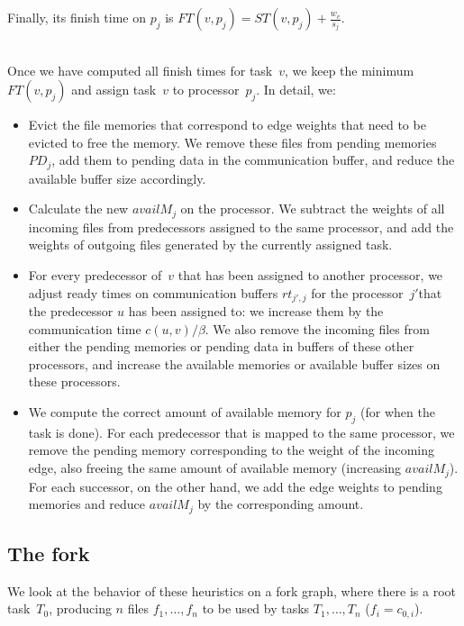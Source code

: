 \documentclass[conference]{IEEEtran}
\begin{document}
  \noindent  Finally, its finish time on $p_j$ is 
    $FT(v,p_j) = ST(v, p_j) + \frac{w_v}{s_j}$.



    \medskip
    \\
    Once we have computed all finish times for task~$v$,
    we keep the minimum $FT(v,p_j)$ and assign task~$v$
    to processor~$p_j$.
    In detail, we:
    \begin{itemize}
        \item  Evict the file memories that correspond to edge weights that need to be evicted to free the memory.
        We remove these files from pending memories
        $PD_j$, add them to pending data in the communication buffer, and reduce the available buffer size accordingly.
        \item    Calculate the new $availM_j$ on the processor.
        We subtract the weights of all incoming files from predecessors assigned to the same processor,
        and add the weights of outgoing files generated by the currently assigned task.
        \item  For every predecessor of~$v$ that has been assigned to another processor, we adjust ready times on
        communication buffers $rt_{j', j}$ for the processor~$j'$that the predecessor $u$ has been assigned to: we increase them by the
        communication time $c( u,v) / \beta$.
        We also remove the incoming files from either the pending memories or pending data in buffers of these other
        processors, and increase the available memories or available buffer sizes on these processors.
        \item We compute the correct amount of available memory for $p_j$ (for when the task is done).
        For each predecessor that is mapped to the same processor, we remove the pending memory corresponding to the weight of
        the incoming edge, also freeing the same amount of available memory (increasing $availM_j$).
        For each successor, on the other hand, we add the edge weights to pending memories and reduce $availM_j$ by the corresponding
        amount.
    \end{itemize}

    \subsection{The fork}
    We look at the behavior of these heuristics on a fork graph,
    where there is a root task~$T_0$, producing $n$ files $f_1, \ldots, f_n$
    to be used by tasks $T_1, \ldots, T_n$ ($f_i = c_{0,i}$).
\end{document}
